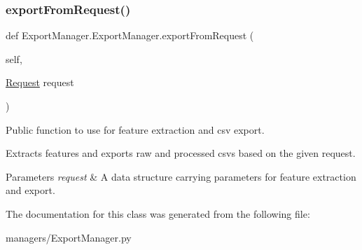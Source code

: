 \subsubsection{\texorpdfstring{exportFromRequest()}{exportFromRequest()}}
{\footnotesize\ttfamily def Export\+Manager.\+Export\+Manager.\+export\+From\+Request (\begin{DoxyParamCaption}\item[{}]{self,  }\item[{\mbox{\hyperlink{class_request_1_1_request}{Request}}}]{request }\end{DoxyParamCaption})}



Public function to use for feature extraction and csv export. 

Extracts features and exports raw and processed csv\textquotesingle{}s based on the given request. 
\begin{DoxyParams}{Parameters}
{\em request} & A data structure carrying parameters for feature extraction and export. \\
\hline
\end{DoxyParams}


The documentation for this class was generated from the following file\+:\begin{DoxyCompactItemize}
\item 
managers/Export\+Manager.\+py\end{DoxyCompactItemize}
